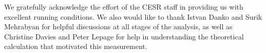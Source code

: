 \documentclass[aps,prd,preprint,superscriptaddress,tightenlines,nofootinbib,floatfix]{revtex4}
\begin{document}
We gratefully acknowledge the effort of the CESR staff in providing us
with excellent running conditions.  We also would like to thank Istvan
Danko and Surik Mehrabyan for helpful discussions at all stages of the
analysis, as well as Christine Davies and Peter Lepage for help in
understanding the theoretical calculation that motivated this
measurement.



%
%


\end{document}
